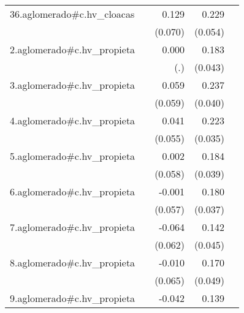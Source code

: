 {\begin{longtable}{l*{4}{D{.}{.}{-1}}}
\addlinespace
36.aglomerado#c.hv\_cloacas&                     &       0.129         &       0.229\sym{***}&                     \\
            &                     &     (0.070)         &     (0.054)         &                     \\
\addlinespace
2.aglomerado#c.hv\_propieta&                     &       0.000         &       0.183\sym{***}&                     \\
            &                     &         (.)         &     (0.043)         &                     \\
\addlinespace
3.aglomerado#c.hv\_propieta&                     &       0.059         &       0.237\sym{***}&                     \\
            &                     &     (0.059)         &     (0.040)         &                     \\
\addlinespace
4.aglomerado#c.hv\_propieta&                     &       0.041         &       0.223\sym{***}&                     \\
            &                     &     (0.055)         &     (0.035)         &                     \\
\addlinespace
5.aglomerado#c.hv\_propieta&                     &       0.002         &       0.184\sym{***}&                     \\
            &                     &     (0.058)         &     (0.039)         &                     \\
\addlinespace
6.aglomerado#c.hv\_propieta&                     &      -0.001         &       0.180\sym{***}&                     \\
            &                     &     (0.057)         &     (0.037)         &                     \\
\addlinespace
7.aglomerado#c.hv\_propieta&                     &      -0.064         &       0.142\sym{**} &                     \\
            &                     &     (0.062)         &     (0.045)         &                     \\
\addlinespace
8.aglomerado#c.hv\_propieta&                     &      -0.010         &       0.170\sym{***}&                     \\
            &                     &     (0.065)         &     (0.049)         &                     \\
\addlinespace
9.aglomerado#c.hv\_propieta&                     &      -0.042         &       0.139\sym{**} &                     \\

\end{longtable}}
